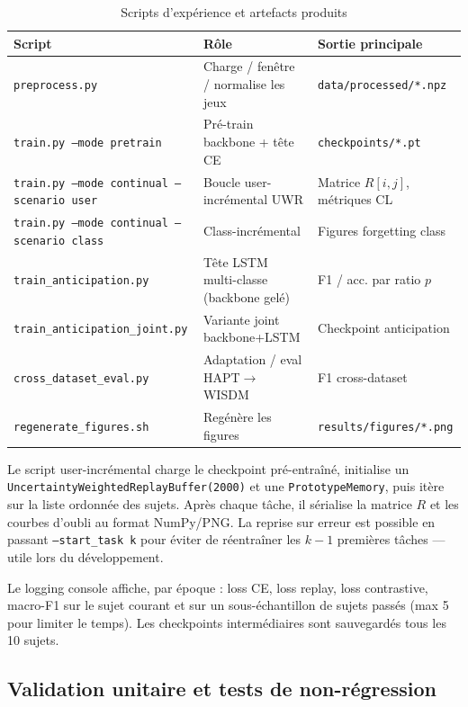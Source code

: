 \documentclass[a4paper,12pt]{report}
\begin{document}
\begin{table}[H]
\centering
\small
\begin{tabularx}{\textwidth}{|>{\raggedright\arraybackslash}p{4.5cm}|Y|>{\raggedright\arraybackslash}p{3.2cm}|}
\hline
\textbf{Script} & \textbf{Rôle} & \textbf{Sortie principale} \\
\hline
\texttt{preprocess.py} & Charge / fenêtre / normalise les jeux & \texttt{data/processed/*.npz} \\
\texttt{train.py --mode pretrain} & Pré-train backbone + tête CE & \texttt{checkpoints/*.pt} \\
\texttt{train.py --mode continual --scenario user} & Boucle user-incrémental UWR & Matrice $R[i,j]$, métriques CL \\
\texttt{train.py --mode continual --scenario class} & Class-incrémental & Figures forgetting class \\
\texttt{train\_anticipation.py} & Tête LSTM multi-classe (backbone gelé) & F1 / acc. par ratio $p$ \\
\texttt{train\_anticipation\_joint.py} & Variante joint backbone+LSTM & Checkpoint anticipation \\
\texttt{cross\_dataset\_eval.py} & Adaptation / eval HAPT$\rightarrow$WISDM & F1 cross-dataset \\
\texttt{regenerate\_figures.sh} & Regénère les figures & \texttt{results/figures/*.png} \\
\hline
\end{tabularx}
\caption{Scripts d'expérience et artefacts produits}
\label{tab:scripts_exp}
\end{table}

Le script user-incrémental charge le checkpoint pré-entraîné, initialise un
\texttt{UncertaintyWeightedReplayBuffer(2000)} et une \texttt{PrototypeMemory},
puis itère sur la liste ordonnée des sujets. Après chaque tâche, il sérialise
la matrice $R$ et les courbes d'oubli au format NumPy/PNG. La reprise sur
erreur est possible en passant \texttt{--start\_task k} pour éviter de
réentraîner les $k-1$ premières tâches — utile lors du développement.

Le logging console affiche, par époque : loss CE, loss replay, loss contrastive,
macro-F1 sur le sujet courant et sur un sous-échantillon de sujets passés (max
5 pour limiter le temps). Les checkpoints intermédiaires sont sauvegardés tous
les 10 sujets.

\subsection{Validation unitaire et tests de non-régression}
\end{document}
